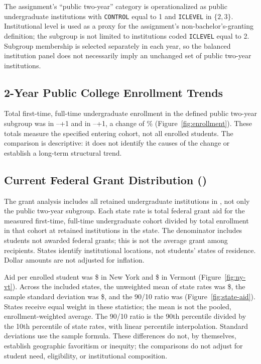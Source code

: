 \documentclass[12pt]{article}
\newcommand{\AcademicYear}[1]{#1--\number\numexpr#1+1\relax}
\begin{document}
The assignment's ``public two-year'' category is operationalized as public
undergraduate institutions with \texttt{CONTROL} equal to 1 and
\texttt{ICLEVEL} in $\{2,3\}$. Institutional level is used as a proxy for the
assignment's non-bachelor's-granting definition; the subgroup is not limited
to institutions coded \texttt{ICLEVEL} equal to 2. Subgroup membership is
selected separately in each year, so the balanced institution panel does not
necessarily imply an unchanged set of public two-year institutions.

\subsection*{2-Year Public College Enrollment Trends}
Total first-time, full-time undergraduate enrollment in the defined public
two-year subgroup was \EnrollmentStart{} in
\AcademicYear{\StudyStartYear} and \EnrollmentEnd{} in
\AcademicYear{\StudyEndYear}, a change of \EnrollmentChangePct{}\%
(Figure~\ref{fig:enrollment}). These totals measure the specified entering
cohort, not all enrolled students. The comparison is descriptive: it does not
identify the causes of the change or establish a long-term structural trend.

\newpage
\subsection*{Current Federal Grant Distribution (\AidAcademicYear)}
The grant analysis includes all retained undergraduate institutions in
\AidAcademicYear{}, not only the public two-year subgroup. Each state rate is
total federal grant aid for the measured first-time, full-time undergraduate
cohort divided by total enrollment in that cohort at retained institutions in
the state. The denominator includes students not awarded federal grants;
this is not the average grant among recipients. States identify institutional
locations, not students' states of residence. Dollar amounts are not adjusted
for inflation.

Aid per enrolled student was \$\NYAid{} in New York and \$\VTAid{} in
Vermont (Figure~\ref{fig:ny-vt}). Across the \PanelStates{} included states,
the unweighted mean of state rates was \$\CurrentAidMean{}, the sample
standard deviation was \$\CurrentAidSD{}, and the 90/10 ratio was
\CurrentAidRatio{} (Figure~\ref{fig:state-aid}). States receive equal weight
in these statistics; the mean is not the pooled, enrollment-weighted average.
The 90/10 ratio is the 90th percentile divided by the 10th percentile of state
rates, with linear percentile interpolation. Standard deviations use the
sample formula. These differences do not, by themselves, establish geographic
favoritism or inequity; the comparisons do not adjust for student need,
eligibility, or institutional composition.
\end{document}
